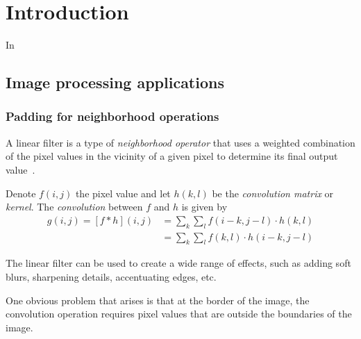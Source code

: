 \documentclass[12pt]{article} %
\begin{document}

\tableofcontents %

\newpage %


\section{Introduction} %

In \citep{Ignjatovic2009}
\the \columnwidth


\subsection{Image processing applications}

\subsubsection{Padding for neighborhood operations}

A linear filter is a type of \emph{neighborhood operator} that uses a weighted 
combination of the pixel values in the vicinity of a given pixel to determine 
its final output value~\cite[p.~111]{Szeliski2011}.

Denote $f(i, j)$ the pixel value and let $h(k, l)$ be the \emph{convolution 
matrix} or \emph{kernel}. The \emph{convolution} between $f$ and $h$ is given by
\begin{align} \label{eq:linear_filter_convolution}
	g(i, j) = [f \ast h](i, j) 	&= \sum_k \sum_l f(i-k, j-l) \cdot h(k, l) \\
								&= \sum_k \sum_l f(k, l) \cdot h(i-k, j-l)  \nonumber
\end{align}

The linear filter can be used to create a wide range of effects, such as adding 
soft blurs, sharpening details, accentuating edges, etc.

One obvious problem that arises is that at the border of the image, the 
convolution operation requires pixel values that are outside the boundaries
of the image.
\end{document}
